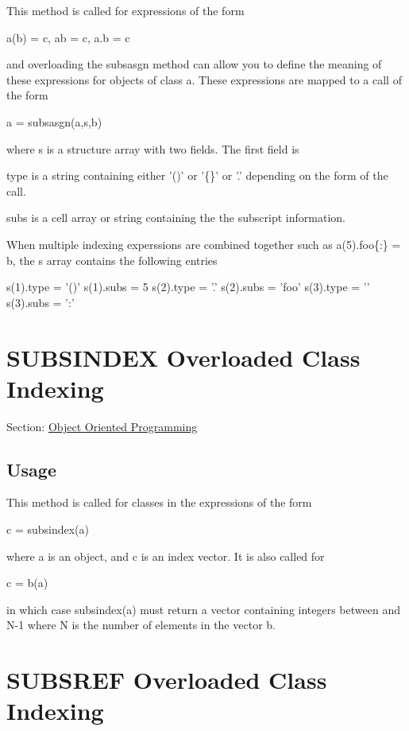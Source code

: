 This method is called for expressions of the form \begin{DoxyVerb}  a(b) = c, a{b} = c, a.b = c
\end{DoxyVerb}
 and overloading the {\ttfamily subsasgn} method can allow you to define the meaning of these expressions for objects of class {\ttfamily a}. These expressions are mapped to a call of the form \begin{DoxyVerb}  a = subsasgn(a,s,b)
\end{DoxyVerb}
 where {\ttfamily s} is a structure array with two fields. The first field is 
\begin{DoxyItemize}
\item {\ttfamily type} is a string containing either {\ttfamily '()'} or {\ttfamily '\{\}'} or {\ttfamily '.'} depending on the form of the call.  
\item {\ttfamily subs} is a cell array or string containing the the subscript information.  
\end{DoxyItemize}When multiple indexing experssions are combined together such as {\ttfamily a(5).foo\{\-:\} = b}, the {\ttfamily s} array contains the following entries \begin{DoxyVerb}  s(1).type = '()'  s(1).subs = {5}
  s(2).type = '.'   s(2).subs = 'foo'
  s(3).type = '{}'  s(3).subs = ':'
\end{DoxyVerb}
 \hypertarget{class_subsindex}{}\section{S\-U\-B\-S\-I\-N\-D\-E\-X Overloaded Class Indexing}\label{class_subsindex}
Section\-: \hyperlink{sec_class}{Object Oriented Programming} \hypertarget{vtkwidgets_vtkxyplotwidget_Usage}{}\subsection{Usage}\label{vtkwidgets_vtkxyplotwidget_Usage}
This method is called for classes in the expressions of the form \begin{DoxyVerb}  c = subsindex(a)
\end{DoxyVerb}
 where {\ttfamily a} is an object, and {\ttfamily c} is an index vector. It is also called for \begin{DoxyVerb}  c = b(a)
\end{DoxyVerb}
 in which case {\ttfamily subsindex(a)} must return a vector containing integers between {} and {\ttfamily N-\/1} where {\ttfamily N} is the number of elements in the vector {\ttfamily b}. \hypertarget{class_subsref}{}\section{S\-U\-B\-S\-R\-E\-F Overloaded Class Indexing}\label{class_subsref}
